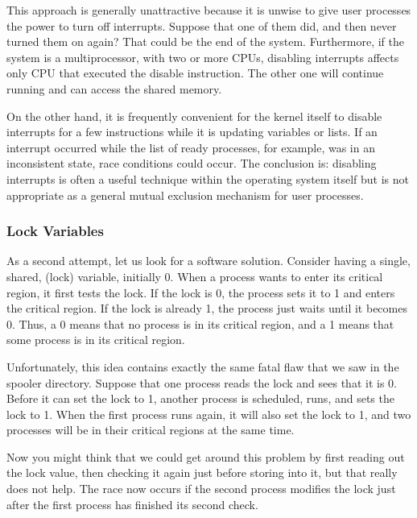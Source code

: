 \documentclass{book}
\begin{document}
This approach is generally unattractive because it is unwise to give user processes the power to turn off interrupts.
Suppose that one of them did, and then never turned them on again?
That could be the end of the system.
Furthermore, if the system is a multiprocessor, with two or more CPUs, 
disabling interrupts affects only CPU that executed the disable instruction.
The other one will continue running and can access the shared memory.

On the other hand, it is frequently convenient for the kernel itself to disable interrupts 
for a few instructions while it is updating variables or lists.
If an interrupt occurred while the list of ready processes, for example, was in an inconsistent state, race conditions could occur.
The conclusion is: disabling interrupts is often a useful technique within the operating system itself
but is not appropriate as a general mutual exclusion mechanism for user processes.

\subsubsection*{Lock Variables}
As a second attempt, let us look for a software solution.
Consider having a single, shared, (lock) variable, initially 0.
When a process wants to enter its critical region, it first tests the lock.
If the lock is 0, the process sets it to 1 and enters the critical region.
If the lock is already 1, the process just waits until it becomes 0.
Thus, a 0 means that no process is in its critical region, and a 1 means that some process is in its critical region.

Unfortunately, this idea contains exactly the same fatal flaw that we saw in the spooler directory.
Suppose that one process reads the lock and sees that it is 0.
Before it can set the lock to 1, another process is scheduled, runs, and sets the lock to 1.
When the first process runs again, it will also set the lock to 1, and two processes will be in their critical regions at the same time.

Now you might think that we could get around this problem by first reading out the lock value,
then checking it again just before storing into it, but that really does not help.
The race now occurs if the second process modifies the lock just after the first process has finished its second check.
\end{document}
